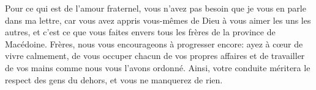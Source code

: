 Pour ce qui est de l’amour fraternel,
	vous n’avez pas besoin que je vous en parle dans ma lettre,
	car vous avez appris vous-mêmes de Dieu à vous aimer les uns les autres,
	et c’est ce que vous faites envers tous les frères de la province de Macédoine.
Frères, nous vous encourageons à progresser encore:
	ayez à cœur de vivre calmement, de vous occuper chacun de vos propres affaires
	et de travailler de vos mains comme nous vous l’avons ordonné.
Ainsi, votre conduite méritera le respect des gens du dehors,
	et vous ne manquerez de rien.

